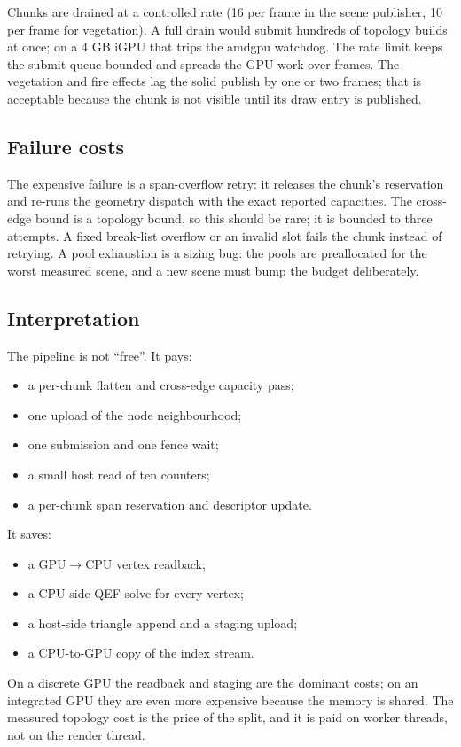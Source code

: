 Chunks are drained at a controlled rate (16 per frame in the scene
publisher, 10 per frame for vegetation).  A full drain would submit
hundreds of topology builds at once; on a 4 GB iGPU that trips the amdgpu
watchdog.  The rate limit keeps the submit queue bounded and spreads the
GPU work over frames.  The vegetation and fire effects lag the solid
publish by one or two frames; that is acceptable because the chunk is not
visible until its draw entry is published.

\subsection{Failure costs}

The expensive failure is a span-overflow retry: it releases the chunk's
reservation and re-runs the geometry dispatch with the exact reported
capacities.  The cross-edge bound is a topology bound, so this should be
rare; it is bounded to three attempts.  A fixed break-list overflow or an
invalid slot fails the chunk instead of retrying.  A pool exhaustion is a
sizing bug: the pools are preallocated for the worst measured scene, and a
new scene must bump the budget deliberately.

\subsection{Interpretation}

The pipeline is not ``free''.  It pays:
\begin{itemize}
\item a per-chunk flatten and cross-edge capacity pass;
\item one upload of the node neighbourhood;
\item one submission and one fence wait;
\item a small host read of ten counters;
\item a per-chunk span reservation and descriptor update.
\end{itemize}
It saves:
\begin{itemize}
\item a GPU$\rightarrow$CPU vertex readback;
\item a CPU-side QEF solve for every vertex;
\item a host-side triangle append and a staging upload;
\item a CPU-to-GPU copy of the index stream.
\end{itemize}
On a discrete GPU the readback and staging are the dominant costs; on an
integrated GPU they are even more expensive because the memory is shared.
The measured topology cost is the price of the split, and it is paid on
worker threads, not on the render thread.
